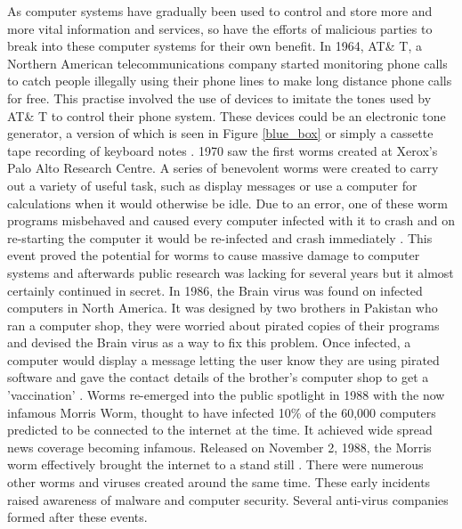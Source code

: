 As computer systems have gradually been used to control and store more and more vital information and services, so have the efforts of malicious parties to break into these computer systems for their own benefit. In 1964, AT\& T, a Northern American telecommunications company started monitoring phone calls to catch people illegally using their phone lines to make long distance phone calls for free. This practise involved the use of devices to imitate the tones used by AT\& T to control their phone system. These devices could be an electronic tone generator, a version of which is seen in Figure \ref{blue_box} or simply a cassette tape recording of keyboard notes
\cite{RN56}. 1970 saw the first worms created at Xerox's Palo Alto Research Centre. A series of benevolent worms were created to carry out a variety of useful task, such as display messages or use a computer for calculations when it would otherwise be idle. Due to an error, one of these worm programs misbehaved and caused every computer infected with it to crash and on re-starting the computer it would be re-infected and crash immediately 
\cite{RN93}. This event proved the potential for worms to cause massive damage to computer systems and afterwards public research was lacking for several years but it almost certainly continued in secret. In 1986, the Brain virus was found on infected computers in North America. It was designed by two brothers in Pakistan who ran a computer shop, they were worried about pirated copies of their programs and devised the Brain virus as a way to fix this problem. Once infected, a computer would display a message letting the user know they are using pirated software and gave the contact details of the brother's computer shop to get a 'vaccination' 
\cite{RN86}. Worms re-emerged into the public spotlight in 1988 with the now infamous Morris Worm, thought to have infected 10\% of the 60,000 computers predicted to be connected to the internet at the time. It achieved wide spread news coverage becoming infamous. Released on November 2, 1988, the Morris worm effectively brought the internet to a stand still 
\cite{RN90}. There were numerous other worms and viruses created around the same time. These early incidents raised awareness of malware and computer security. Several anti-virus companies formed after these events.

